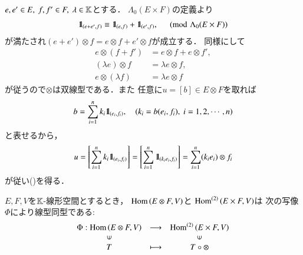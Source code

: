 	\begin{prf}
		$e,e' \in E,\ f,f' \in F,\ \lambda \in \mathbb{K}$とする．
		$\Lambda_0(E \times F)$の定義より
		\begin{align}
			\mbox{1}\hspace{-0.25em}\mbox{l}_{(e+e',f)} \equiv \mbox{1}\hspace{-0.25em}\mbox{l}_{(e,f)}+\mbox{1}\hspace{-0.25em}\mbox{l}_{(e',f)},
			\quad \pmod{\Lambda_0(E \times F)}
		\end{align}
		が満たされ$(e + e') \otimes f = e \otimes f + e' \otimes f$が成立する．
		同様にして
		\begin{align}
			e \otimes (f+f') &= e \otimes f + e \otimes f', \\
			(\lambda e) \otimes f &= \lambda e \otimes f, \\
			e \otimes (\lambda f) &= \lambda e \otimes f
		\end{align}
		が従うので$\otimes$は双線型である．また
		任意に$u = [b] \in E \otimes F$を取れば
		\begin{align}
			b = \sum_{i=1}^n k_i \mbox{1}\hspace{-0.25em}\mbox{l}_{(e_i,f_i)},
			\quad \left( k_i = b(e_i,f_i),\ i=1,2,\cdots,n \right)
		\end{align}
		と表せるから，
		\begin{align}
			u = \left[ \sum_{i=1}^n k_i \mbox{1}\hspace{-0.25em}\mbox{l}_{(e_i,f_i)} \right]
			= \left[ \sum_{i=1}^n \mbox{1}\hspace{-0.25em}\mbox{l}_{(k_i e_i,f_i)} \right]
			= \sum_{i=1}^n (k_i e_i) \otimes f_i
		\end{align}
		が従い()を得る．
		\QED
	\end{prf}
	
	\begin{screen}
		\begin{thm}[テンソル積の普遍性]
			$E,F,V$を$\mathbb{K}$-線形空間とするとき，
			$\mathrm{Hom} \left(E \otimes F,V\right)$と
			$\mathrm{Hom}^{(2)} \left(E \times F,V\right)$は
			次の写像$\Phi$により線型同型である:
			\begin{align}
				\begin{array}{ccc}
					\Phi:\Hom{E \otimes F}{V} & \longrightarrow & \Bilin{E \times F}{V} \\
					\rotatebox{90}{$\in$} & & \rotatebox{90}{$\in$} \\
					T & \longmapsto & T \circ \otimes
				\end{array}
			\end{align}
		\end{thm}
	\end{screen}
	
